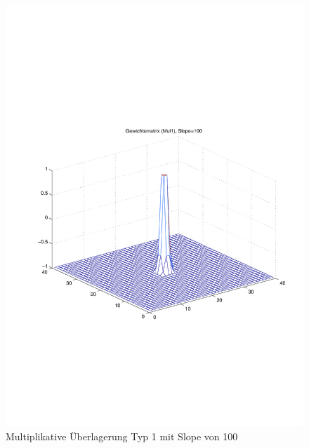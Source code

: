 \begin{figure}[hbt]
	\centering
	\includegraphics[width=0.6\linewidth]{./Bilder/Auswertung/Gewichtsmatrix/Gewichtsmatrix_Mul1_Slope_100}
	\caption{Multiplikative Überlagerung Typ 1 mit Slope von 100}
	\label{Mul1100}
\end{figure}

\newpage
